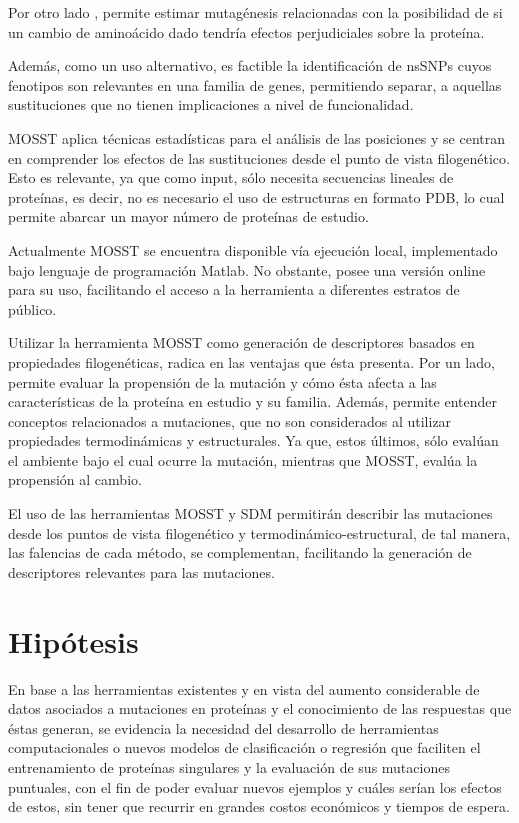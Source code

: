 Por otro lado , permite estimar mutagénesis relacionadas con la posibilidad de si un cambio de aminoácido dado tendría efectos perjudiciales sobre la proteína. 

Además, como un uso alternativo, es factible la identificación de nsSNPs cuyos fenotipos son relevantes en una familia de genes, permitiendo separar, a aquellas sustituciones que no tienen implicaciones a nivel de funcionalidad.


MOSST aplica técnicas estadísticas para el análisis de las posiciones y se centran en comprender los efectos de las sustituciones desde el punto de vista filogenético. Esto es relevante, ya que como input, sólo necesita secuencias lineales de proteínas, es decir, no es necesario el uso de estructuras en formato PDB, lo cual permite abarcar un mayor número de proteínas de estudio.

Actualmente MOSST se encuentra disponible vía ejecución local, implementado bajo lenguaje de programación Matlab. No obstante, posee una versión online para su uso, facilitando el acceso a la herramienta a diferentes estratos de público.

Utilizar la herramienta MOSST como generación de descriptores basados en propiedades filogenéticas, radica en las ventajas que ésta presenta. Por un lado, permite evaluar la propensión de la mutación y cómo ésta afecta a las características de la proteína en estudio y su familia. Además, permite entender conceptos relacionados a mutaciones, que no son considerados al utilizar propiedades termodinámicas y estructurales. Ya que, estos últimos, sólo evalúan el ambiente bajo el cual ocurre la mutación, mientras que MOSST, evalúa la propensión al cambio. 

El uso de las herramientas MOSST y SDM permitirán describir las mutaciones desde los puntos de vista filogenético y termodinámico-estructural, de tal manera, las falencias de cada método, se complementan, facilitando la generación de descriptores relevantes para las mutaciones.

\section{Hipótesis}

En base a las herramientas existentes y en vista del aumento considerable de datos asociados a mutaciones en proteínas y el conocimiento de las respuestas que éstas generan, se evidencia la necesidad del desarrollo de herramientas computacionales o nuevos modelos de clasificación o regresión que faciliten el entrenamiento de proteínas singulares y la evaluación de sus mutaciones puntuales, con el fin de poder evaluar nuevos ejemplos y cuáles serían los efectos de estos, sin tener que recurrir en grandes costos económicos y tiempos de espera. 

